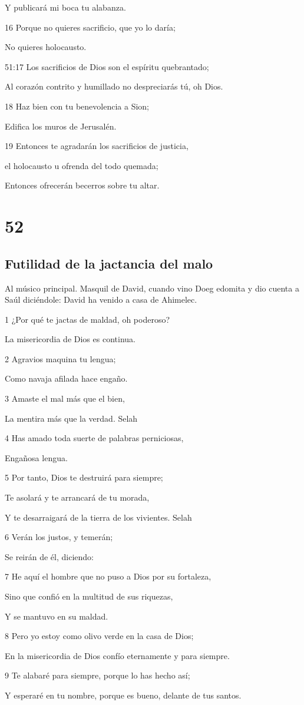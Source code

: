 \par Y publicará mi boca tu alabanza.
\par 16 Porque no quieres sacrificio, que yo lo daría;
\par No quieres holocausto.
\par 51:17 Los sacrificios de Dios son el espíritu quebrantado;
\par Al corazón contrito y humillado no despreciarás tú, oh Dios.
\par 18 Haz bien con tu benevolencia a Sion;
\par Edifica los muros de Jerusalén.
\par 19 Entonces te agradarán los sacrificios de justicia,
\par el holocausto u ofrenda del todo quemada;
\par Entonces ofrecerán becerros sobre tu altar.

\chapter{52}

\section*{Futilidad de la jactancia del malo}

\par Al músico principal. Masquil de David, cuando vino Doeg edomita y dio cuenta a Saúl diciéndole: David ha venido a casa de Ahimelec.

\par 1 ¿Por qué te jactas de maldad, oh poderoso?
\par La misericordia de Dios es continua.
\par 2 Agravios maquina tu lengua;
\par Como navaja afilada hace engaño.
\par 3 Amaste el mal más que el bien,
\par La mentira más que la verdad. Selah
\par 4 Has amado toda suerte de palabras perniciosas,
\par Engañosa lengua.
\par 5 Por tanto, Dios te destruirá para siempre;
\par Te asolará y te arrancará de tu morada,
\par Y te desarraigará de la tierra de los vivientes. Selah
\par 6 Verán los justos, y temerán;
\par Se reirán de él, diciendo:
\par 7 He aquí el hombre que no puso a Dios por su fortaleza,
\par Sino que confió en la multitud de sus riquezas,
\par Y se mantuvo en su maldad.
\par 8 Pero yo estoy como olivo verde en la casa de Dios;
\par En la misericordia de Dios confío eternamente y para siempre.
\par 9 Te alabaré para siempre, porque lo has hecho así;
\par Y esperaré en tu nombre, porque es bueno, delante de tus santos.

